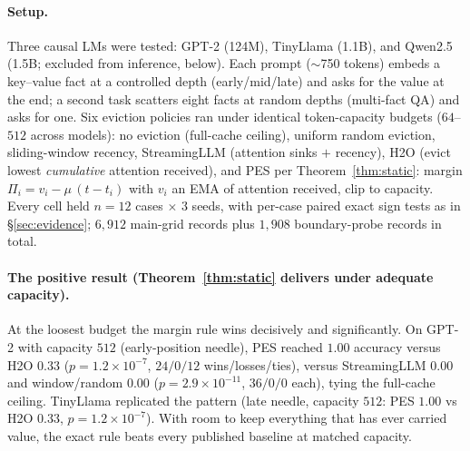 \documentclass[10pt,twocolumn]{article}
\theoremstyle{definition}
\newcommand{\PES}{PES}
\begin{document}
\paragraph{Setup.}
Three causal {LM}s were tested: {GPT-2} (124{M}), {TinyLlama} (1.1{B}), and {Qwen2.5} (1.5{B}; excluded
from inference, below). Each prompt ($\sim$750 tokens) embeds a key--value fact at a controlled depth
(early/mid/late) and asks for the value at the end; a second task scatters eight facts at random depths
(multi-fact {QA}) and asks for one. Six eviction policies ran under identical token-capacity budgets
($64$--$512$ across models): no eviction (full-cache ceiling), uniform random eviction, sliding-window
recency, {StreamingLLM} (attention sinks $+$ recency), {H2O} (evict lowest \emph{cumulative} attention
received), and \PES{} per Theorem~\ref{thm:static}: margin $\Pi_i = v_i - \mu\,(t - t_i)$ with $v_i$ an
{EMA} of attention received, clip to capacity. Every cell held $n{=}12$ cases $\times$ $3$ seeds, with
per-case paired exact sign tests as in \S\ref{sec:evidence}; $6{,}912$ main-grid records plus $1{,}908$
boundary-probe records in total.

\paragraph{The positive result (Theorem~\ref{thm:static} delivers under adequate capacity).}
At the loosest budget the margin rule wins decisively and significantly. On {GPT-2} with capacity $512$
(early-position needle), \PES{} reached $1.00$ accuracy versus {H2O} $0.33$ ($p{=}1.2{\times}10^{-7}$,
$24/0/12$ wins/losses/ties), versus {StreamingLLM} $0.00$ and window/random $0.00$
($p{=}2.9{\times}10^{-11}$, $36/0/0$ each), tying the full-cache ceiling. {TinyLlama} replicated the
pattern (late needle, capacity $512$: \PES{} $1.00$ vs {H2O} $0.33$, $p{=}1.2{\times}10^{-7}$). With room
to keep everything that has ever carried value, the exact rule beats every published baseline at matched
capacity.
\end{document}
